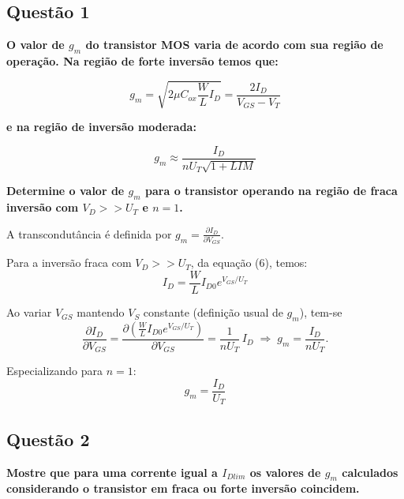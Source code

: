 ﻿\documentclass[12pt,a4paper]{article}
\begin{document}
\subsection*{Questão 1}
\begin{BoxQ}
\textbf{O valor de $g_m$ do transistor MOS varia de acordo com sua região de operação. Na região de forte inversão temos que:}

\begin{equation}
    g_m = \sqrt{2\mu C_{ox} \frac{W}{L} I_D} = \frac{2I_D}{V_{GS} - V_T}
\end{equation}

\textbf{e na região de inversão moderada:}

\begin{equation}
    g_m \approx \frac{I_D}{nU_T \sqrt{1 +LIM}} 
\end{equation}

\textbf{Determine o valor de $g_m$ para o transistor operando na região de fraca inversão com $V_D >> U_T$ e $n = 1$.}
\end{BoxQ}\par

A transcondutância é definida por $g_m = \frac{\partial I_D}{\partial V_{GS}}$.

Para a inversão fraca com $V_D >> U_T$, da equação (6), temos:
\begin{equation*}
I_D = \frac{W}{L} I_{D0} e^{V_{GS}/U_T}
\end{equation*}

Ao variar $V_{GS}$ mantendo $V_S$ constante (definição usual de $g_m$), tem-se
\begin{equation*}
\frac{\partial I_D}{\partial V_{GS}} = \frac{\partial (\frac{W}{L} I_{D0} e^{V_{GS}/U_T})}{\partial V_{GS}} = \frac{1}{nU_T}\, I_D \;\Rightarrow\; g_m = \frac{I_D}{nU_T}.
\end{equation*}

Especializando para $n = 1$:
\begin{equation}
\boxed{g_m = \frac{I_D}{U_T}}
\end{equation}

\subsection*{Questão 2}
\begin{BoxQ}
\textbf{Mostre que para uma corrente igual a $I_{Dlim}$ os valores de $g_m$ calculados considerando o transistor em fraca ou forte inversão coincidem.}
\end{BoxQ}\par
\end{document}
